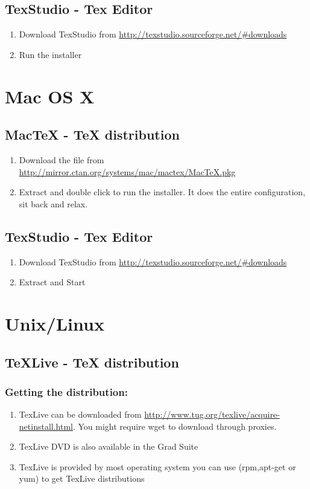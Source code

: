\subsection*{TexStudio - Tex Editor}
\begin{enumerate}
\item	Download TexStudio from \href{http://texstudio.sourceforge.net/\#downloads}{http://texstudio.sourceforge.net/\#downloads} 
\item	Run the installer
\end{enumerate}

\section*{Mac OS X}
\subsection*{MacTeX - TeX distribution}
\begin{enumerate}
\item	Download the file from \href{http://mirror.ctan.org/systems/mac/mactex/MacTeX.pkg}{http://mirror.ctan.org/systems/mac/mactex/MacTeX.pkg}
\item	Extract and double click to run the installer. It does the entire configuration, sit back and relax.
\end{enumerate}

\subsection*{TexStudio - Tex Editor}
\begin{enumerate}
\item	Download TexStudio from \href{http://texstudio.sourceforge.net/\#downloads}{http://texstudio.sourceforge.net/\#downloads} 
\item	Extract and Start
\end{enumerate}


\section*{Unix/Linux}
\subsection*{TeXLive - TeX distribution}
\subsubsection*{Getting the distribution:}
\begin{enumerate}
\item	TexLive can be downloaded from \href{http://www.tug.org/texlive/acquire-netinstall.html}{http://www.tug.org/texlive/acquire-netinstall.html}. You might require wget to download through proxies.
\item	TexLive DVD is also available in the Grad Suite
\item	TexLive is provided by most operating system you can use (rpm,apt-get or yum) to get TexLive distributions
\end{enumerate}

